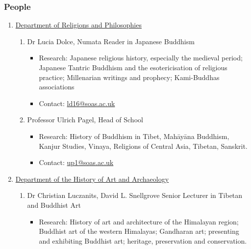 \documentclass[a4paper,10.5pt]{article}
\begin{document}
\subsubsection{People}
\label{sec:orgc2cb6a6}
\begin{enumerate}
\item \href{https://www.soas.ac.uk/about/schools-departments-and-sections/department-religions-and-philosophies}{Department of Religions and Philosophies}
\label{sec:org6657f4e}
\begin{enumerate}
\item Dr Lucia Dolce, Numata Reader in Japanese Buddhism
\label{sec:org19f0791}
\begin{itemize}
\item Research: Japanese religious history, especially the medieval period; Japanese Tantric Buddhism and the esotericisation of religious practice; Millenarian writings and prophecy; Kami-Buddhas associations\\
\item Contact: \href{mailto:ld16@soas.ac.uk}{ld16@soas.ac.uk}\\
\end{itemize}
\item Professor Ulrich Pagel, Head of School
\label{sec:org8eb377d}
\begin{itemize}
\item Research: History of Buddhism in Tibet, Mahāyāna Buddhism, Kanjur Studies, Vinaya, Religions of Central Asia, Tibetan, Sanskrit.\\
\item Contact: \href{mailto:up1@soas.ac.uk}{up1@soas.ac.uk}\\
\end{itemize}
\end{enumerate}
\item \href{https://www.soas.ac.uk/about/schools-departments-and-sections/department-history-art-and-archaeology}{Department of the History of Art and Archaeology}
\label{sec:org0e914da}
\begin{enumerate}
\item Dr Christian Luczanits, David L. Snellgrove Senior Lecturer in Tibetan and Buddhist Art
\label{sec:org03b6525}
\begin{itemize}
\item Research: History of art and architecture of the Himalayan region; Buddhist art of the western Himalayas; Gandharan art; presenting and exhibiting Buddhist art; heritage, preservation and conservation.\\

\end{itemize}
\end{enumerate}
\end{enumerate}
\end{document}
